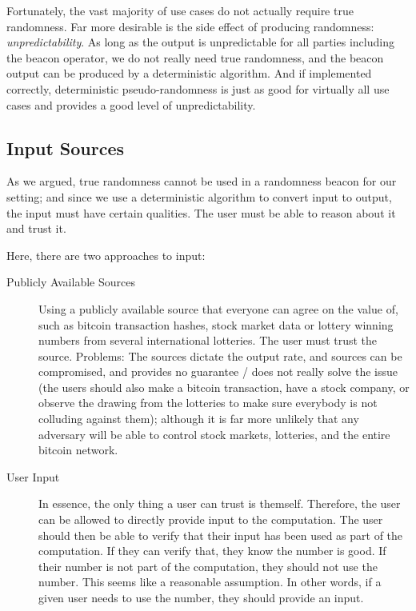 Fortunately, the vast majority of use cases do not actually require true randomness.
Far more desirable is the side effect of producing randomness: \emph{unpredictability}.
As long as the output is unpredictable for all parties including the beacon operator, we do not really need true randomness, and the beacon output can be produced by a deterministic algorithm.
And if implemented correctly, deterministic pseudo-randomness is just as good for virtually all use cases and provides a good level of unpredictability.

\subsection{Input Sources}
As we argued, true randomness cannot be used in a randomness beacon for our setting;
and since we use a deterministic algorithm to convert input to output, the input must have certain qualities.
The user must be able to reason about it and trust it.

Here, there are two approaches to input:

\begin{description}
    \item[Publicly Available Sources] Using a publicly available source that everyone can agree on the value of, such as bitcoin transaction hashes, stock market data or lottery winning numbers from several international lotteries.
The user must trust the source.
Problems: The sources dictate the output rate, and sources can be compromised, and provides no guarantee / does not really solve the issue (the users should also make a bitcoin transaction, have a stock company, or observe the drawing from the lotteries to make sure everybody is not colluding against them); although it is far more unlikely that any adversary will be able to control stock markets, lotteries, and the entire bitcoin network.

    \item[User Input] In essence, the only thing a user can trust is themself.
Therefore, the user can be allowed to directly provide input to the computation.
The user should then be able to verify that their input has been used as part of the computation.
If they can verify that, they know the number is good.
If their number is not part of the computation, they should not use the number.
This seems like a reasonable assumption.
In other words, if a given user needs to use the number, they should provide an input.
\end{description}

